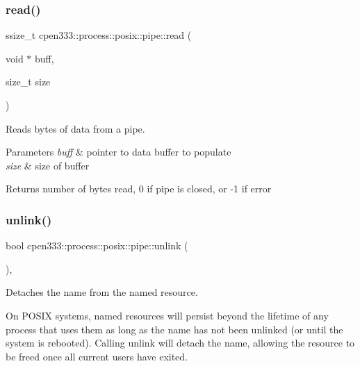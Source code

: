 \subsubsection{\texorpdfstring{read()}{read()}}
{\footnotesize\ttfamily ssize\+\_\+t cpen333\+::process\+::posix\+::pipe\+::read (\begin{DoxyParamCaption}\item[{void $\ast$}]{buff,  }\item[{size\+\_\+t}]{size }\end{DoxyParamCaption})\hspace{0.3cm}{\ttfamily [inline]}}



Reads bytes of data from a pipe. 


\begin{DoxyParams}{Parameters}
{\em buff} & pointer to data buffer to populate \\
\hline
{\em size} & size of buffer \\
\hline
\end{DoxyParams}
\begin{DoxyReturn}{Returns}
number of bytes read, 0 if pipe is closed, or -\/1 if error 
\end{DoxyReturn}
\mbox{\label{classcpen333_1_1process_1_1posix_1_1pipe_ac1dd8e1a7fd46480b709e96190afe697}} 
\subsubsection{\texorpdfstring{unlink()}{unlink()}\hspace{0.1cm}{\footnotesize\ttfamily [1/2]}}
{\footnotesize\ttfamily bool cpen333\+::process\+::posix\+::pipe\+::unlink (\begin{DoxyParamCaption}{ }\end{DoxyParamCaption})\hspace{0.3cm}{\ttfamily [inline]}, {\ttfamily [virtual]}}



Detaches the name from the named resource. 

On P\+O\+S\+IX systems, named resources will persist beyond the lifetime of any process that uses them as long as the name has not been unlinked (or until the system is rebooted). Calling {\ttfamily unlink} will detach the name, allowing the resource to be freed once all current users have exited.

